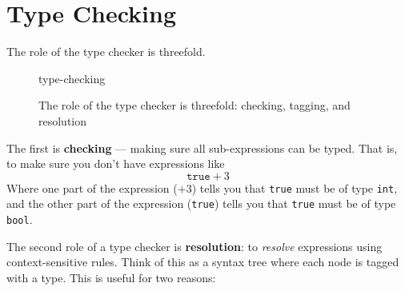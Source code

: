 {%



\section{Type Checking}\label{section:type-checking-goals}
The role of the type checker is threefold. 

\begin{figure}[H]
    \centering
    {type-checking}
    \caption{The role of the type checker is threefold: checking, tagging, and resolution}
    \label{fig:type-inference}
\end{figure}

The first is \textbf{checking} --- making sure all sub-expressions can be typed. That is, to make sure you don't have expressions like
\[\texttt{true}+3\]
Where one part of the expression ($+3$) tells you that \texttt{true} must be of type \texttt{int}, and the other part of the expression (\texttt{true}) tells you that \texttt{true} must be of type \texttt{bool}.

The second role of a type checker is \textbf{resolution}: to \textit{resolve} expressions using context-sensitive rules. Think of this as a syntax tree where each node is tagged with a type. This is useful for two reasons:

}
